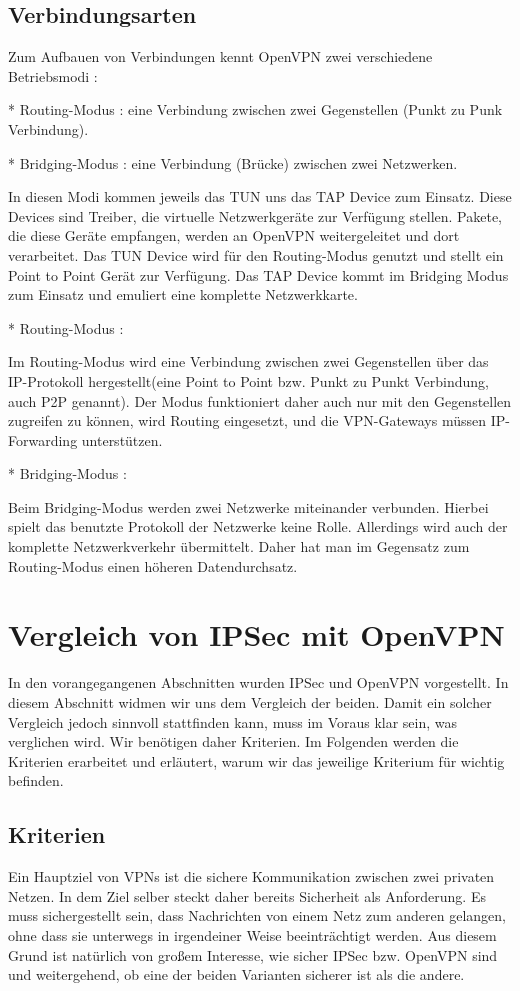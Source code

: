 \documentclass[12pt]{scrartcl}
\begin{document}
\subsection{Verbindungsarten}

Zum Aufbauen von Verbindungen kennt OpenVPN zwei verschiedene Betriebsmodi :

* Routing-Modus : eine Verbindung zwischen zwei Gegenstellen (Punkt zu Punk Verbindung).

* Bridging-Modus : eine Verbindung (Brücke) zwischen zwei Netzwerken.

In diesen Modi kommen jeweils das TUN uns das TAP Device zum Einsatz. Diese Devices sind Treiber, die virtuelle Netzwerkgeräte zur Verfügung stellen. Pakete, die diese Geräte empfangen, werden an OpenVPN weitergeleitet und dort verarbeitet. Das TUN Device wird für den Routing-Modus genutzt und stellt ein Point to Point Gerät zur Verfügung. Das TAP Device kommt im Bridging Modus zum Einsatz und emuliert eine komplette Netzwerkkarte. 

* Routing-Modus :

Im Routing-Modus wird eine Verbindung zwischen zwei Gegenstellen über das IP-Protokoll hergestellt(eine Point to Point bzw. Punkt zu Punkt Verbindung, auch P2P genannt). Der  Modus funktioniert daher auch nur mit den Gegenstellen zugreifen zu können, wird Routing eingesetzt, und die VPN-Gateways müssen IP-Forwarding unterstützen.

* Bridging-Modus : 

Beim Bridging-Modus werden zwei Netzwerke miteinander verbunden. Hierbei spielt das benutzte Protokoll der Netzwerke keine Rolle. Allerdings wird auch der komplette Netzwerkverkehr übermittelt. Daher hat man im Gegensatz zum Routing-Modus einen höheren Datendurchsatz.

\section{Vergleich von IPSec mit OpenVPN}

In den vorangegangenen Abschnitten wurden IPSec und OpenVPN vorgestellt. In diesem Abschnitt widmen wir uns dem Vergleich der beiden. Damit ein solcher Vergleich jedoch sinnvoll stattfinden kann, muss im Voraus klar sein, was verglichen wird. Wir benötigen daher Kriterien. Im Folgenden werden die Kriterien erarbeitet und erläutert, warum wir das jeweilige Kriterium für wichtig befinden.

\subsection{Kriterien}
Ein Hauptziel von VPNs ist die sichere Kommunikation zwischen zwei privaten Netzen. In dem Ziel selber steckt daher bereits Sicherheit als Anforderung. Es muss sichergestellt sein, dass Nachrichten von einem Netz zum anderen gelangen, ohne dass sie unterwegs in irgendeiner Weise beeinträchtigt werden. Aus diesem Grund ist natürlich von großem Interesse, wie sicher IPSec bzw. OpenVPN sind und weitergehend, ob eine der beiden Varianten sicherer ist als die andere.
\end{document}

